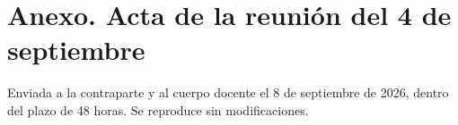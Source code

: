 
\section*{Anexo. Acta de la reunión del 4 de septiembre}

\noindent Enviada a la contraparte y al cuerpo docente el 8 de septiembre de 2026, dentro del plazo de 48 horas. Se reproduce sin modificaciones.


